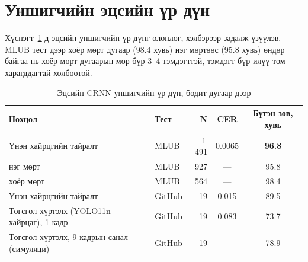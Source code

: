 \section{Уншигчийн эцсийн үр дүн}
Хүснэгт~\ref{tab:rec}-д эцсийн уншигчийн үр дүнг олонлог, хэлбэрээр задалж үзүүлэв. MLUB тест дээр хоёр мөрт дугаар (98.4 хувь) нэг мөртөөс (95.8 хувь) өндөр байгаа нь хоёр мөрт дугаарын мөр бүр 3--4 тэмдэгттэй, тэмдэгт бүр илүү том харагддагтай холбоотой.
\begin{table}[H]\centering\caption{Эцсийн CRNN уншигчийн үр дүн, бодит дугаар дээр}\label{tab:rec}
\begin{tabular}{llrcc}\toprule
Нөхцөл & Тест & N & CER & Бүтэн зөв, хувь\\\midrule
Үнэн хайрцгийн тайралт & MLUB & 1\,491 & 0.0065 & \textbf{96.8}\\
\quad нэг мөрт & MLUB & 927 & --- & 95.8\\
\quad хоёр мөрт & MLUB & 564 & --- & 98.4\\
Үнэн хайрцгийн тайралт & GitHub & 19 & 0.015 & 89.5\\
Төгсгөл хүртэлх (YOLO11n хайрцаг), 1 кадр & GitHub & 19 & 0.083 & 73.7\\
Төгсгөл хүртэлх, 9 кадрын санал (симуляци) & GitHub & 19 & --- & 78.9\\\bottomrule
\end{tabular}\end{table}

